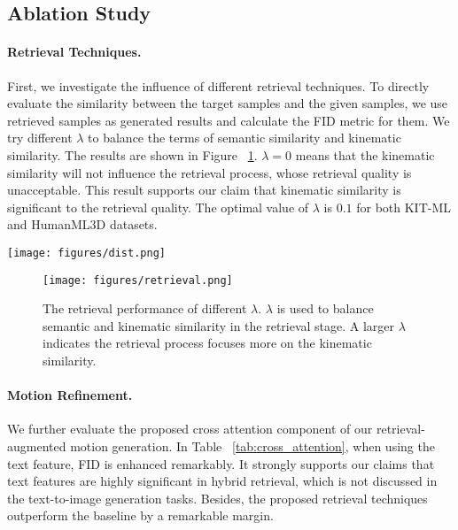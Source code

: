 \documentclass[10pt,twocolumn,letterpaper]{article}
\begin{document}
\subsection{Ablation Study}



\paragraph{Retrieval Techniques.} First, we investigate the influence of different retrieval techniques. To directly evaluate the similarity between the target samples and the given samples, we use retrieved samples as generated results and calculate the FID metric for them. We try different $\lambda$ to balance the terms of semantic similarity and kinematic similarity. The results are shown in Figure ~\ref{fig:retrieval}. $\lambda=0$ means that the kinematic similarity will not influence the retrieval process, whose retrieval quality is unacceptable. This result supports our claim that kinematic similarity is significant to the retrieval quality. The optimal value of $\lambda$ is $0.1$ for both KIT-ML and HumanML3D datasets.

\begin{figure*}[h]
    \centering
    \texttt{[image: figures/dist.png]}
    \caption{\textbf{Rareness distribution of HumanML3D test split.} We split all testcases into 100 bins according to its Rareness value.}
    \label{fig:dist}
\end{figure*}

\begin{figure}[t]
    \centering
    \texttt{[image: figures/retrieval.png]}
    \caption{The retrieval performance of different $\lambda$. $\lambda$ is used to balance semantic and kinematic similarity in the retrieval stage. A larger $\lambda$ indicates the retrieval process focuses more on the kinematic similarity.}
    \label{fig:retrieval}
    \vspace{-15pt}
\end{figure}

\paragraph{Motion Refinement.} We further evaluate the proposed cross attention component of our retrieval-augmented motion generation. In Table ~\ref{tab:cross_attention}, when using the text feature, FID is enhanced remarkably. It strongly supports our claims that text features are highly significant in hybrid retrieval, which is not discussed in the text-to-image generation tasks. Besides, the proposed retrieval techniques outperform the baseline by a remarkable margin.
\end{document}
